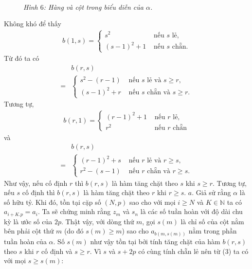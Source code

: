 \begin{multicols}{2}
\begin{figure}[H]
		\caption{\small\textit{\color{cackithi}Hình $6$: Hàng và cột trong biểu diễn của $\alpha$.}}
		\vspace*{-10pt}
	\end{figure}
	Không khó để thấy
		\begin{align*}
			b(1,s) = 
			\begin{cases}
				s^2 & \text{ nếu } s \text{ lẻ,} \\
				(s-1)^2 + 1 & \text{ nếu } s \text{ chẵn}.
			\end{cases}
		\end{align*}
		Từ đó ta có
		\begin{align*} 
			&b(r,s)\\
			 =& 
			\begin{cases}
				\!\!s^2 \!-\! (r\!-\!1) &\!\!\! \text{ nếu } s \text{ lẻ và } s \ge r, \\
				\!\!(s\!-\!1)^2 \!+\! r &\!\!\! \text{ nếu } s \text{ chẵn và } s \ge r.
			\end{cases}\tag{$3$}
		\end{align*}
		Tương tự,
		\begin{align*}
			b(r,1) = 
			\begin{cases}
				(r-1)^2 + 1 & \text{ nếu } r \text{ lẻ,} \\
				r^2 & \text{ nếu } r \text{ chẵn}
			\end{cases}
		\end{align*}
		và 
		\begin{align*}
			&b(r,s) \\
			= 
			&\begin{cases}
				\!\!(r\!-\!1)^2 \!+\! s &\!\!\! \text{ nếu } r \text{ lẻ và } r \ge s, \\
				\!\!r^2 \!-\! (s\!-\!1) &\!\!\!\text{ nếu } r \text{ chẵn và } r \ge s.
			\end{cases}\tag{$4$}
		\end{align*}
		Như vậy, nếu cố định $r$ thì $b(r,s)$ là hàm tăng chặt theo $s$ khi $s \ge r$. Tương tự, nếu $s$ cố định thì $b(r,s)$ là hàm tăng chặt theo $r$ khi $r \ge s$.
		\vskip 0.1cm
		$a.$ Giả sử rằng $\alpha$ là số hữu tỷ. Khi đó, tồn tại cặp số $(N,p)$ sao cho với mọi $i \ge N$ và $K \in \mathbb{N}$ ta có $a_{i + K.p} = a_i$. Ta sẽ chứng minh rằng $z_m$ và $s_n$ là các số tuần hoàn với độ dài chu kỳ là ước số của $2p$.
		\vskip 0.1cm
		Thật vậy, với dòng thứ $m$, gọi $s(m)$ là chỉ số của cột nằm bên phải cột thứ $m$ (do đó $s(m) \ge m$) sao cho $a_{b(m,s(m))}$ nằm trong phần tuần hoàn của $\alpha$. Số $s(m)$ như vậy tồn tại bởi tính tăng chặt của hàm $b(r,s)$ theo $s$ khi $r$ cố định và $s \ge r$. Vì $s$ và $s + 2p$ có cùng tính chẵn lẻ nên từ ($3$) ta có với mọi $s \ge s(m)$: 

\end{multicols}
